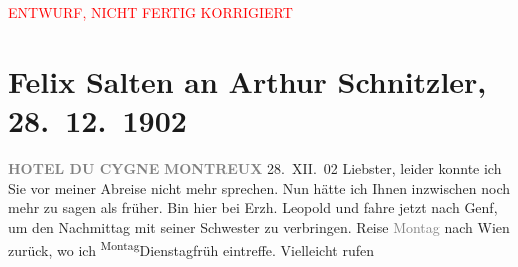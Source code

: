 
\begin{center}
            \textcolor{red}{ENTWURF, NICHT FERTIG KORRIGIERT}
                      \end{center}
            
         
         \renewcommand{\erwaehntePersonen}{Personen: Samuel Fischer, Hugo von Hofmannsthal,  Luise von Österreich-Toskana, Leopold Ferdinand Salvator Wölfling}
         \renewcommand{\erwaehnteOrte}{Orte: Genf, Hotel du Cygne Montreux, Montreux, Wien}
         \renewcommand{\erwaehnteWerke}{}
               \section[Felix Salten an Arthur Schnitzler, 28. 12. 1902]{ Felix Salten an Arthur Schnitzler, 28. 12. 1902}\nopagebreak{}\rehead{ }\begin{ledgroupsized}[t]{13cm}\normalsize\beginnumbering \toendnotes[C]{\smallbreak\pagebreak[2]} 
\toendnotes[C]{\smallbreak}\pstart
           \noindent{}\raggedleft{}{\pb}\textcolor{gray}{\textbf{HOTEL DU CYGNE}}\pend
           \pstart
           \noindent{}\raggedleft{}\textcolor{gray}{\textbf{MONTREUX}}\pend
           \pstart
           \raggedleft{}28. XII. 02\pend
           \pstart
           Liebster, leider konnte ich Sie vor meiner Abreise nicht mehr
               sprechen. Nun hätte ich Ihnen inzwischen noch mehr zu sagen als früher. \pend
           \pstart
           Bin hier bei Erzh. Leopold und fahre jetzt
               nach Genf, um den Nachmittag mit seiner Schwester zu verbringen.
               Reise \textcolor{gray}{Montag} nach Wien zurück,
               wo ich \substVorne{}\textsuperscript{Montag}{\allowbreak}\substDazwischen{}Dienstag\substHinten{}{ }{\pb}früh eintreffe. Vielleicht rufen

\end{ledgroupsized}
